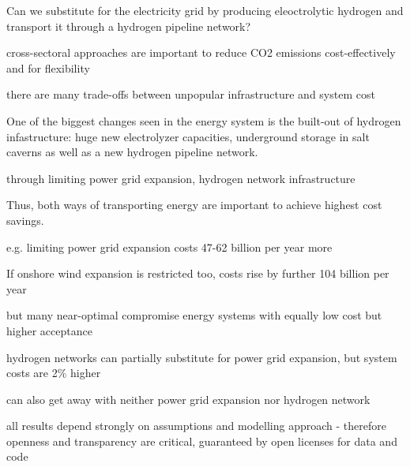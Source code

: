 Can we substitute for the electricity grid by producing eleoctrolytic hydrogen
and transport it through a hydrogen pipeline network?


cross-sectoral approaches are important to reduce CO2 emissions cost-effectively and for flexibility

there are many trade-offs between unpopular infrastructure and system cost

One of the biggest changes seen in the energy system is the built-out of
hydrogen infastructure: huge new electrolyzer capacities, underground storage in
salt caverns as well as a new hydrogen pipeline network.

through limiting power grid expansion, hydrogen network infrastructure

Thus, both ways of transporting energy are important to achieve highest
cost savings.

e.g. limiting power grid expansion costs 47-62 billion per year more

If onshore wind expansion is restricted too, costs rise by further 104 billion per year

but many near-optimal compromise energy systems with equally low cost but higher acceptance

hydrogen networks can partially substitute for power grid expansion, but system costs are
2\% higher

can also get away with neither power grid expansion nor hydrogen network

all results depend strongly on assumptions and modelling approach
- therefore openness and transparency are critical, guaranteed by open licenses for data and code